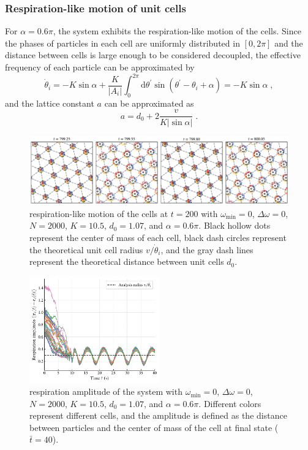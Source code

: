 \documentclass{article}
\begin{document}
\newpage
\subsubsection{Respiration-like motion of unit cells}

For $\alpha=0.6\pi$, the system exhibits the respiration-like motion of the cells. Since the phases of particles in each cell are uniformly distributed in $[0, 2\pi]$ and the distance between cells is large enough to be considered decoupled, the effective frequency of each particle can be approximated by
\begin{equation}
    \dot{\theta}_i=-K\sin \alpha +\frac{K}{\left| A_i \right|}\int_0^{2\pi}{\mathrm{d}\theta ^{\prime}\sin \left( \theta ^{\prime}-\theta _i+\alpha \right)}=-K\sin \alpha\;,
\end{equation}
and the lattice constant $a$ can be approximated as 
\begin{equation}
    a=d_0+2\frac{v}{K\left| \sin \alpha \right|}\;.
    \label{eq:latticeConstant}
\end{equation}
\begin{figure}[H]
    \centering
    \includegraphics[width=\textwidth]{./figs/respiration_snapshot.pdf}
    \caption{
        \label{fig:respiration_snapshot}
        respiration-like motion of the cells at $t=200$ with $\omega _{\min}=0$, $\Delta \omega=0$, $N=2000$, $K=10.5$, $d_0=1.07$, and $\alpha=0.6\pi$. Black hollow dots represent the center of mass of each cell, black dash circles represent the theoretical unit cell radius $v/\dot{\theta}_i$, and the gray dash lines represent the theoretical distance between unit cells $d_0$.
    }
\end{figure}
\begin{figure}[H]
    \centering
    \includegraphics[width=0.5\textwidth]{./figs/respiration_amplitude.pdf}
    \caption{
        \label{fig:respiration_amplitude}
        respiration amplitude of the system with $\omega _{\min}=0$, $\Delta \omega=0$, $N=2000$, $K=10.5$, $d_0=1.07$, and $\alpha=0.6\pi$. 
        Different colors represent different cells, and the amplitude is defined as the distance between particles and the center of mass of the cell at final state ($\bar{t}=40$).
    }
\end{figure}
\end{document}
